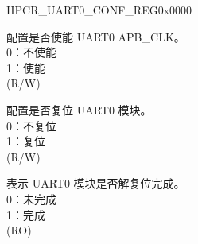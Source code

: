 \begin{register}{H}{PCR\_UART0\_CONF\_REG}{0x0000}\label{regdesc:PCRUART0CONFREG}
%
%
%
%
\regnewline%
\begin{regdesc}\begin{reglist}
\label{fielddesc:PCRUART0CLKEN}\item [PCR\_UART0\_CLK\_EN] 配置是否使能 UART0 APB\_CLK。\\
0：不使能\\
1：使能\\ (R/W)
\label{fielddesc:PCRUART0RSTEN}\item [PCR\_UART0\_RST\_EN] 配置是否复位 UART0 模块。\\
0：不复位\\
1：复位\\
(R/W)
\label{fielddesc:PCRUART0READY}\item [PCR\_UART0\_READY] 表示 UART0 模块是否解复位完成。\\
0：未完成\\
1：完成\\ (RO)
\end{reglist}\end{regdesc}
\end{register}


